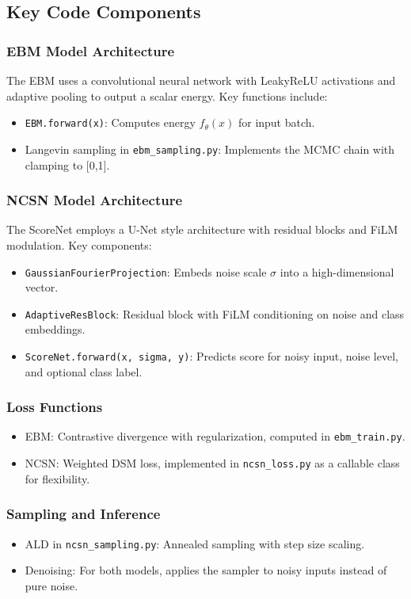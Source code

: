\documentclass[a4paper,12pt]{article}
\begin{document}
\subsection{Key Code Components}
\subsubsection{EBM Model Architecture}
The EBM uses a convolutional neural network with LeakyReLU activations and adaptive pooling to output a scalar energy. Key functions include:
\begin{itemize}[leftmargin=*]
    \item \texttt{EBM.forward(x)}: Computes energy $f_\theta(x)$ for input batch.
    \item Langevin sampling in \texttt{ebm\_sampling.py}: Implements the MCMC chain with clamping to [0,1].
\end{itemize}

\subsubsection{NCSN Model Architecture}
The ScoreNet employs a U-Net style architecture with residual blocks and FiLM modulation. Key components:
\begin{itemize}[leftmargin=*]
    \item \texttt{GaussianFourierProjection}: Embeds noise scale $\sigma$ into a high-dimensional vector.
    \item \texttt{AdaptiveResBlock}: Residual block with FiLM conditioning on noise and class embeddings.
    \item \texttt{ScoreNet.forward(x, sigma, y)}: Predicts score for noisy input, noise level, and optional class label.
\end{itemize}

\subsubsection{Loss Functions}
\begin{itemize}[leftmargin=*]
    \item EBM: Contrastive divergence with regularization, computed in \texttt{ebm\_train.py}.
    \item NCSN: Weighted DSM loss, implemented in \texttt{ncsn\_loss.py} as a callable class for flexibility.
\end{itemize}

\subsubsection{Sampling and Inference}
\begin{itemize}[leftmargin=*]
    \item ALD in \texttt{ncsn\_sampling.py}: Annealed sampling with step size scaling.
    \item Denoising: For both models, applies the sampler to noisy inputs instead of pure noise.
\end{itemize}
\end{document}
